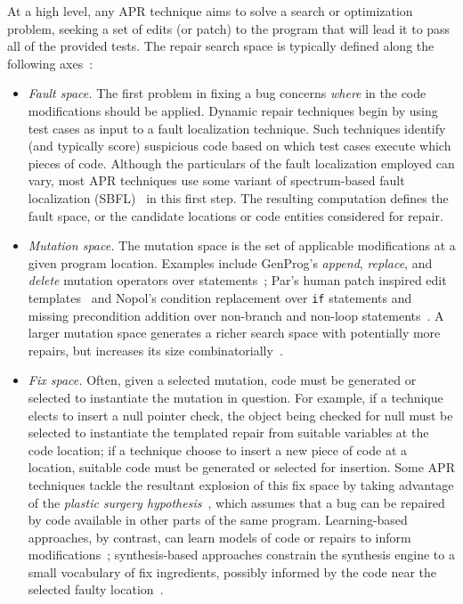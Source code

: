 \documentclass[sigconf, timestamp-false, anonymous=true]{acmart}
\begin{document}
At a high level, any APR technique aims to solve a search or optimization
problem, seeking a set of edits (or patch) to the program that will lead it to
pass all of the provided tests. The repair search space is typically defined
along the following axes~\cite{ae,sqjo}:
\begin{itemize}

\item \emph{Fault space.} The first problem in fixing a bug concerns
  \emph{where} in the code modifications should be applied. Dynamic repair
  techniques begin by using test cases as input to a fault localization
  technique. Such techniques identify (and typically score) suspicious code
  based on which test cases execute which pieces of code. Although the
  particulars of the fault localization employed can vary, most APR techniques use some
  variant of spectrum-based fault localization (SBFL)~\cite{ochiai} in this first
  step. The resulting computation defines the fault space, or the candidate
  locations or code entities considered for repair.

\item \emph{Mutation space.} The mutation space is the set of applicable
  modifications at a given program location. Examples include GenProg's
  \emph{append}, \emph{replace}, and \emph{delete} mutation operators over
  statements~\cite{genprog-operators}; Par's human patch inspired edit
  templates~\cite{par} and Nopol's condition replacement over 
  \texttt{if} statements and missing precondition addition over non-branch and
  non-loop statements~\cite{Xuan17}.  A larger mutation space generates a richer
  search space with potentially more repairs, but increases its size
  combinatorially~\cite{long-search-spaces}.

\item \emph{Fix space.} Often, given a selected mutation, code must be generated
  or selected to instantiate the mutation in question.  For example, if a
  technique elects to insert a null
  pointer check, the object being checked for null must be selected to
  instantiate the templated repair from suitable variables at the code location;
  if a technique choose to insert a new piece of code at a location, suitable
  code must be generated or selected for insertion. Some APR
  techniques tackle the resultant explosion of this fix space by taking
  advantage of the \emph{plastic surgery hypothesis}~\cite{plastic}, which
  assumes that a bug can be repaired by code available in other parts of the
  same program.  Learning-based approaches, by contrast, can learn models of
  code or repairs to inform modifications~\cite{prophet}; synthesis-based
  approaches constrain the synthesis engine to a small vocabulary of fix
  ingredients, possibly informed by the code near the selected faulty
  location~\cite{angelix,s3}. 


\end{itemize}
\end{document}
